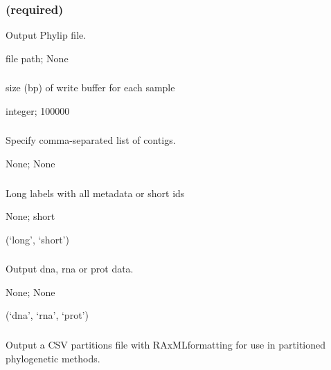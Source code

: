 \documentclass[letterpaper,11pt,english]{sphinxmanual}
\begin{document}
\subsubsection{ (required)}
\label{\detokenize{prog_desc:id23}}
 Output Phylip file.

 file path;  None


\subsubsection{}
\label{\detokenize{prog_desc:id24}}
 size (bp) of write buffer for each sample

 integer;  100000


\subsubsection{}
\label{\detokenize{prog_desc:contigs}}
 Specify comma-separated list of contigs.

 None;  None


\subsubsection{}
\label{\detokenize{prog_desc:id25}}
 Long labels with all metadata or short ids

 None;  short

 (‘long’, ‘short’)


\subsubsection{}
\label{\detokenize{prog_desc:id26}}
 Output dna, rna or prot data.

 None;  None

 (‘dna’, ‘rna’, ‘prot’)


\subsubsection{}
\label{\detokenize{prog_desc:partition}}
 Output a CSV partitions file with RAxMLformatting for use in partitioned phylogenetic methods.
\end{document}
